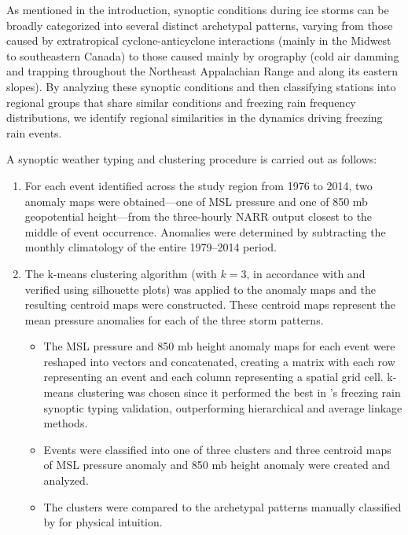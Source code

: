 \documentclass[twocol]{ametsoc}
\begin{document}
As mentioned in the introduction, synoptic conditions during ice storms can be broadly categorized into several distinct archetypal patterns, varying from those caused by extratropical cyclone-anticyclone interactions (mainly in the Midwest to southeastern Canada) to those caused mainly by orography (cold air damming and trapping throughout the Northeast Appalachian Range and along its eastern slopes). By analyzing these synoptic conditions and then classifying stations into regional groups that share similar conditions and freezing rain frequency distributions, we identify regional similarities in the dynamics driving freezing rain events.

A synoptic weather typing and clustering procedure is carried out as follows:

\begin{enumerate}
\item
For each event identified across the study region from 1976 to 2014, two anomaly maps were obtained---one of MSL pressure and one of 850 mb geopotential height---from the three-hourly NARR output closest to the middle of event occurrence. Anomalies were determined by subtracting the monthly climatology of the entire 1979--2014 period.
\item
The k-means clustering algorithm (with $k=3$, in accordance with \citet{erfani2012automated} and verified using silhouette plots) was applied to the anomaly maps and the resulting centroid maps were constructed. These centroid maps represent the mean pressure anomalies for each of the three storm patterns.
\begin{itemize}
\item
The MSL pressure and 850 mb height anomaly maps for each event were reshaped into vectors and concatenated, creating a matrix with each row representing an event and each column representing a spatial grid cell. k-means clustering was chosen since it performed the best in \citet{erfani2012automated}'s freezing rain synoptic typing validation, outperforming hierarchical and average linkage methods.
\item
Events were classified into one of three clusters and three centroid maps of MSL pressure anomaly and 850 mb height anomaly were created and analyzed.
\item
The clusters were compared to the archetypal patterns manually classified by \citet{rauber2001synoptic} for physical intuition.
\end{itemize}
\end{enumerate}
\end{document}
